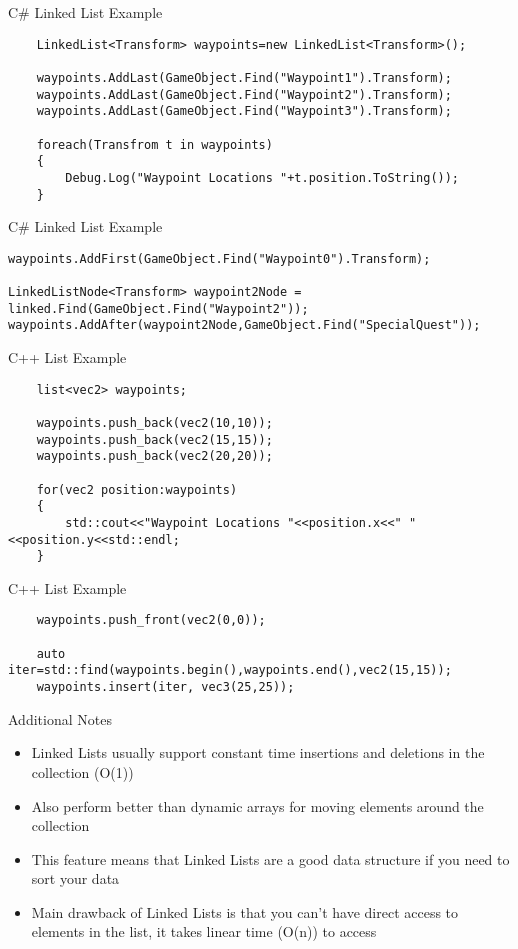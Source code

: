 \begin{frame}[fragile]{C\# Linked List
Example}
\begin{lstlisting}
	LinkedList<Transform> waypoints=new LinkedList<Transform>();
	
	waypoints.AddLast(GameObject.Find("Waypoint1").Transform);
	waypoints.AddLast(GameObject.Find("Waypoint2").Transform);
	waypoints.AddLast(GameObject.Find("Waypoint3").Transform);
	
	foreach(Transfrom t in waypoints)
	{
		Debug.Log("Waypoint Locations "+t.position.ToString());
	}
\end{lstlisting}
\end{frame}

\begin{frame}[fragile]{C\# Linked List
	Example}
\begin{lstlisting}
waypoints.AddFirst(GameObject.Find("Waypoint0").Transform);

LinkedListNode<Transform> waypoint2Node = linked.Find(GameObject.Find("Waypoint2"));
waypoints.AddAfter(waypoint2Node,GameObject.Find("SpecialQuest"));
\end{lstlisting}
\end{frame}

\begin{frame}[fragile]{C++ List
Example}
\begin{lstlisting}
	list<vec2> waypoints;
	
	waypoints.push_back(vec2(10,10));
	waypoints.push_back(vec2(15,15));
	waypoints.push_back(vec2(20,20));
	
	for(vec2 position:waypoints)
	{
		std::cout<<"Waypoint Locations "<<position.x<<" "<<position.y<<std::endl;
	}
\end{lstlisting}
\end{frame}

\begin{frame}[fragile]{C++ List
	Example}
\begin{lstlisting}
	waypoints.push_front(vec2(0,0));
	
	auto iter=std::find(waypoints.begin(),waypoints.end(),vec2(15,15));
	waypoints.insert(iter, vec3(25,25));
\end{lstlisting}
\end{frame}

\begin{frame}{Additional Notes}
	\begin{itemize}
		\pause \item Linked Lists usually support constant time insertions and deletions in the collection (O(1))
		\pause \item Also perform better than dynamic arrays for moving elements around the collection
		\pause \item This feature means that Linked Lists are a good data structure if you need to sort your data
		\pause \item Main drawback of Linked Lists is that you can't have direct access to elements in the list, it takes linear time (O(n)) to access
	\end{itemize}
\end{frame}